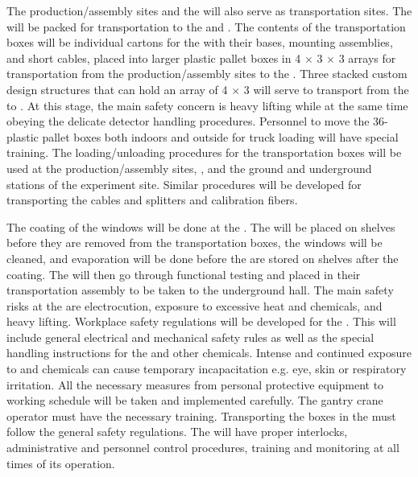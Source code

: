 The production/assembly sites and the  will also serve as transportation sites. The  will be packed for transportation to the  and \surf. The contents of the transportation boxes will be individual cartons for the  with their bases, mounting assemblies, and short cables, placed into larger plastic pallet boxes in \num{4} $\times$ \num{3} $\times$ \num{3} arrays for transportation from the production/assembly sites to the . Three stacked custom design structures that can hold an array of \num{4} $\times$ \num{3}  will serve to transport  from the  to \surf. At this stage, the main safety concern is heavy lifting while at the same time obeying the delicate detector handling procedures. Personnel to move the \num{36}- plastic pallet boxes both indoors and outside for truck loading will have special training. The loading/unloading procedures for the  transportation boxes will be used at the production/assembly sites, , and the ground and underground stations of the experiment site. Similar procedures will be developed for transporting the  cables and splitters and calibration fibers.

The  coating of the  windows will be done at the . The  will be placed on shelves before they are removed from the transportation boxes, the windows will be cleaned, and  evaporation will be done before the  are stored on shelves after the coating. The  will then go through functional testing and placed in their transportation assembly to be taken to the underground hall. The main safety risks at the  are electrocution, exposure to excessive heat and chemicals, and heavy lifting. Workplace safety regulations will be developed for the . This will include general electrical and mechanical safety rules as well as the special handling instructions for the  and other chemicals. Intense and continued exposure to  and chemicals can cause temporary incapacitation e.g. eye, skin or respiratory irritation. All the necessary measures from personal protective equipment to working schedule will be taken and implemented carefully. The gantry crane operator must have the necessary training. Transporting the  boxes in the  must follow the general safety regulations. The  will have proper interlocks, administrative and personnel control procedures, training and monitoring at all times of its operation.

